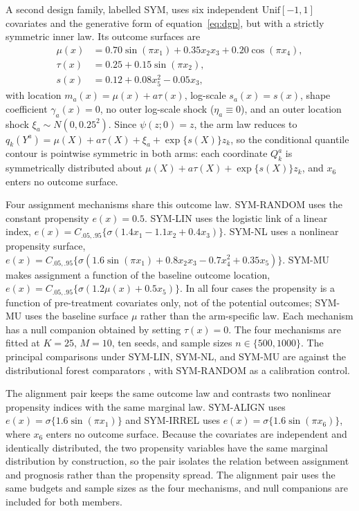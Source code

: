 A second design family, labelled SYM, uses six independent $\mathrm{Unif}[-1,1]$ covariates and the generative form of equation~\eqref{eq:dgp}, but with a strictly symmetric inner law. Its outcome surfaces are
\begin{align*}
\mu(x)&=0.70\sin(\pi x_1)+0.35x_2x_3+0.20\cos(\pi x_4),\\
\tau(x)&=0.25+0.15\sin(\pi x_2),\\
s(x)&=0.12+0.08x_5^2-0.05x_3,
\end{align*}
with location $m_a(x)=\mu(x)+a\tau(x)$, log-scale $s_a(x)=s(x)$, shape coefficient $\gamma_a(x)=0$, no outer log-scale shock ($\eta_a\equiv 0$), and an outer location shock $\xi_a\sim N(0,0.25^2)$. Since $\psi(z;0)=z$, the arm law reduces to $q_k(Y^a)=\mu(X)+a\tau(X)+\xi_a+\exp\{s(X)\}z_k$, so the conditional quantile contour is pointwise symmetric in both arms: each coordinate $Q_k^a$ is symmetrically distributed about $\mu(X)+a\tau(X)+\exp\{s(X)\}z_k$, and $x_6$ enters no outcome surface.

Four assignment mechanisms share this outcome law. SYM-RANDOM uses the constant propensity $e(x)=0.5$. SYM-LIN uses the logistic link of a linear index, $e(x)=C_{.05,.95}\{\sigma(1.4x_1-1.1x_2+0.4x_3)\}$. SYM-NL uses a nonlinear propensity surface, $e(x)=C_{.05,.95}\{\sigma(1.6\sin(\pi x_1)+0.8x_2x_3-0.7x_4^2+0.35x_5)\}$. SYM-MU makes assignment a function of the baseline outcome location, $e(x)=C_{.05,.95}\{\sigma(1.2\mu(x)+0.5x_5)\}$. In all four cases the propensity is a function of pre-treatment covariates only, not of the potential outcomes; SYM-MU uses the baseline surface $\mu$ rather than the arm-specific law. Each mechanism has a null companion obtained by setting $\tau(x)=0$. The four mechanisms are fitted at $K=25$, $M=10$, ten seeds, and sample sizes $n\in\{500,1000\}$. The principal comparisons under SYM-LIN, SYM-NL, and SYM-MU are against the distributional forest comparators \citep{DRF-paper,naf2026causaldrf}, with SYM-RANDOM as a calibration control.

The alignment pair keeps the same outcome law and contrasts two nonlinear propensity indices with the same marginal law. SYM-ALIGN uses $e(x)=\sigma\{1.6\sin(\pi x_1)\}$ and SYM-IRREL uses $e(x)=\sigma\{1.6\sin(\pi x_6)\}$, where $x_6$ enters no outcome surface. Because the covariates are independent and identically distributed, the two propensity variables have the same marginal distribution by construction, so the pair isolates the relation between assignment and prognosis rather than the propensity spread. The alignment pair uses the same budgets and sample sizes as the four mechanisms, and null companions are included for both members.

